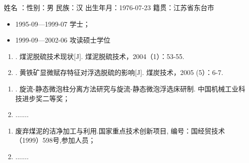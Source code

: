 \begin{resume}

姓名 ：\cumt@author \quad 性别：男 \quad 民族：汉 \quad 出生年月：1976-07-23 \quad 籍贯：江苏省东台市 \par
\begin{itemize}[itemsep=0bp,topsep=0bp,parsep=0bp,itemindent=5\ccwd]
    \item[] 1995-09—1999-07  学士；
    \item[] 1999-09—2002-06  攻读硕士学位
\end{itemize}

\begin{enumerate}[itemsep=0bp,topsep=0bp,parsep=0bp,leftmargin=*]
    \item {}. 煤泥脱硫技术现状[J]. 煤泥脱硫技术，2004（1）：53-55.
    \item {}. 黄铁矿显微赋存特征对浮选脱硫的影响[J]. 煤炭技术，2005 (5）：6-7.
\end{enumerate}

\begin{enumerate}[itemsep=0bp,topsep=0bp,parsep=0bp,leftmargin=*]
    \item {}. 旋流-静态微泡柱分离方法研究与旋流-静态微泡浮选床研制. 中国机械工业科技进步奖二等奖；
    \item .......
\end{enumerate}

\begin{enumerate}[itemsep=0bp,topsep=0bp,parsep=0bp,leftmargin=*]
    \item 废弃煤泥的洁净加工与利用.国家重点技术创新项目, 编号：国经贸技术（1999）598号,参加人员；
    \item .......
\end{enumerate}

\end{resume}